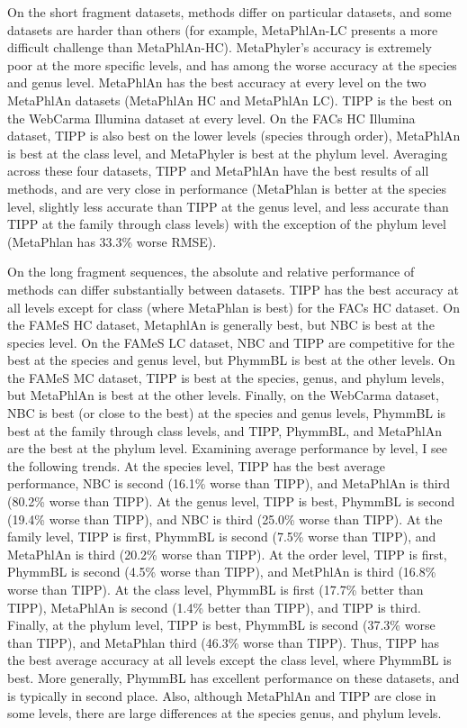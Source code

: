 On the short fragment datasets, 
methods differ on particular datasets,
and some datasets are harder than others
(for example, MetaPhlAn-LC
presents a more difficult challenge than MetaPhlAn-HC).
MetaPhyler's accuracy is extremely poor at the more
specific levels, and has among the worse accuracy at the species and genus level.
MetaPhlAn has the best accuracy at
every level on the two MetaPhlAn datasets (MetaPhlAn HC
and MetaPhlAn LC).
TIPP is the best on the WebCarma Illumina dataset at every
level.
On the FACs HC Illumina dataset,
 TIPP is also best on the lower levels (species through
order),
MetaPhlAn is best at the class level, and
MetaPhyler is best at the phylum level.
Averaging across these four datasets, 
TIPP and MetaPhlAn have the best results of all methods, and
are very close in performance (MetaPhlan
is better at the species level,
slightly less accurate than TIPP at the genus level,
and less accurate than TIPP at the family through class levels) with 
the exception of the phylum level (MetaPhlan has 33.3\% worse RMSE).

On the long fragment sequences, 
the absolute and relative performance of methods can differ
substantially between datasets.
TIPP has the best accuracy at all
levels except for class (where MetaPhlan is 
best) for the FACs HC dataset.
On the FAMeS HC dataset,
MetaphlAn is generally best, but 
NBC is best at the species level.
On the FAMeS LC dataset, NBC and TIPP are competitive for the best at
the species and genus level, but PhymmBL is best at the
other levels.
On the FAMeS MC dataset, TIPP is best at the species, genus,
and phylum levels, but MetaPhlAn is best at the other levels.
Finally, on the WebCarma dataset, NBC is best (or close to the best)
at the species and genus  levels, PhymmBL is 
best at the family through class levels,
and TIPP, PhymmBL, and MetaPhlAn are the best at the 
phylum level.
Examining average performance by level,
I see the following trends.
At the species level, TIPP has the best average 
performance, NBC is second (16.1\% worse than TIPP), 
and MetaPhlAn is third (80.2\% worse than TIPP).
At the genus level, TIPP is best, PhymmBL is
second (19.4\% worse than TIPP), and NBC is third (25.0\% worse than TIPP).
At the family level, TIPP is first, PhymmBL is
second (7.5\% worse than TIPP), and MetaPhlAn is third (20.2\% worse than TIPP).
At the order level, TIPP is first, PhymmBL is second (4.5\% worse than TIPP), and MetPhlAn is
third (16.8\% worse than TIPP). At the class level, PhymmBL is first (17.7\% better than TIPP), MetaPhlAn is second (1.4\% better than TIPP),
and TIPP is third.
Finally, at the phylum level, TIPP is
best, PhymmBL is second (37.3\% worse than TIPP), and MetaPhlan
third (46.3\% worse than TIPP).
Thus, TIPP has the best average accuracy
at all levels except the class level, where PhymmBL is best.
More generally, PhymmBL has excellent performance on
these datasets, and is typically in second place.
Also, although
MetaPhlAn and TIPP are close in some levels, 
there are large differences
at the species genus, and phylum levels.


